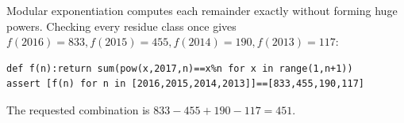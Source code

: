 Modular exponentiation computes each remainder exactly without forming huge powers. Checking every residue class once gives $ f(2016)=833,f(2015)=455,f(2014)=190,f(2013)=117 $:
\begin{verbatim}
def f(n):return sum(pow(x,2017,n)==x%n for x in range(1,n+1))
assert [f(n) for n in [2016,2015,2014,2013]]==[833,455,190,117]
\end{verbatim}
The requested combination is $ 833-455+190-117=\boxed{451}$.
